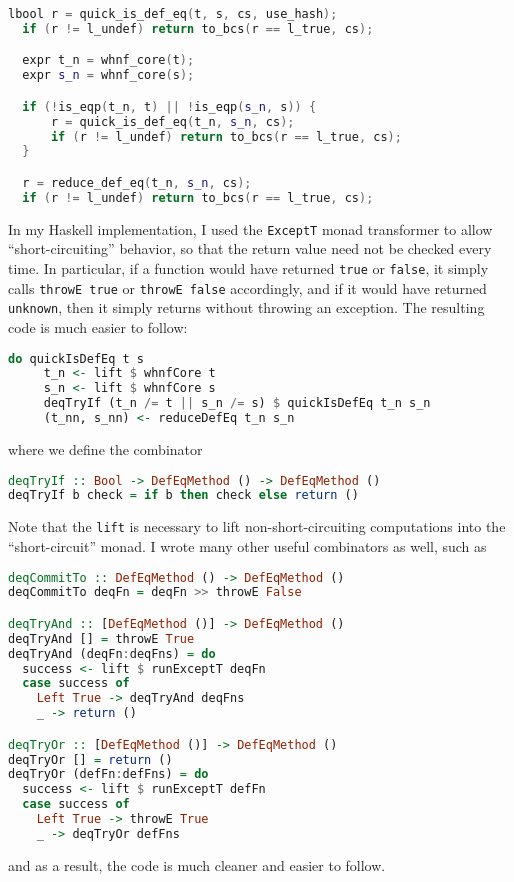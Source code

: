 \documentclass{article}
\begin{document}
\begin{spacing}{1.1}
\begin{lstlisting}[language=C++]
  lbool r = quick_is_def_eq(t, s, cs, use_hash);
  if (r != l_undef) return to_bcs(r == l_true, cs);

  expr t_n = whnf_core(t);
  expr s_n = whnf_core(s);

  if (!is_eqp(t_n, t) || !is_eqp(s_n, s)) {
      r = quick_is_def_eq(t_n, s_n, cs);
      if (r != l_undef) return to_bcs(r == l_true, cs);
  }

  r = reduce_def_eq(t_n, s_n, cs);
  if (r != l_undef) return to_bcs(r == l_true, cs);
\end{lstlisting}

In my Haskell implementation, I used the \lstinline{ExceptT} monad transformer to allow ``short-circuiting'' behavior, so that the return value need not be checked every time. In particular, if a function would have returned \lstinline{true} or \lstinline{false}, it simply calls \lstinline{throwE true} or \lstinline{throwE false} accordingly, and if it would have returned \lstinline{unknown}, then it simply returns without throwing an exception. The resulting code is much easier to follow:

\begin{lstlisting}[language=Haskell]
  do quickIsDefEq t s
     t_n <- lift $ whnfCore t
     s_n <- lift $ whnfCore s
     deqTryIf (t_n /= t || s_n /= s) $ quickIsDefEq t_n s_n
     (t_nn, s_nn) <- reduceDefEq t_n s_n
\end{lstlisting}

where we define the combinator
\begin{lstlisting}[language=Haskell]
deqTryIf :: Bool -> DefEqMethod () -> DefEqMethod ()
deqTryIf b check = if b then check else return ()
\end{lstlisting}

Note that the \lstinline{lift} is necessary to lift non-short-circuiting computations into the ``short-circuit'' monad. I wrote many other useful combinators as well, such as
\begin{lstlisting}[language=Haskell]
deqCommitTo :: DefEqMethod () -> DefEqMethod ()
deqCommitTo deqFn = deqFn >> throwE False

deqTryAnd :: [DefEqMethod ()] -> DefEqMethod ()
deqTryAnd [] = throwE True
deqTryAnd (deqFn:deqFns) = do
  success <- lift $ runExceptT deqFn
  case success of
    Left True -> deqTryAnd deqFns
    _ -> return ()

deqTryOr :: [DefEqMethod ()] -> DefEqMethod ()
deqTryOr [] = return ()
deqTryOr (defFn:defFns) = do
  success <- lift $ runExceptT defFn
  case success of
    Left True -> throwE True
    _ -> deqTryOr defFns
\end{lstlisting}
and as a result, the code is much cleaner and easier to follow.


\end{spacing}
\end{document}
